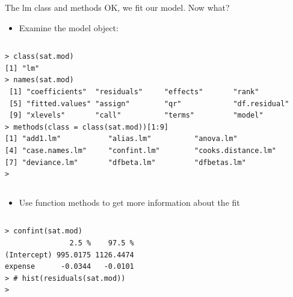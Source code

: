 \documentclass[table,smaller]{beamer}
\begin{document}
\begin{frame}[fragile,label=sec-2-5]{The lm class and methods}
 OK, we fit our model. Now what?
\begin{itemize}
\item Examine the model object:
\end{itemize}

\vspace{-.5em}
\begin{columns}
\begin{block}{}
\begin{verbatim}
> class(sat.mod)
[1] "lm"
> names(sat.mod)
 [1] "coefficients"  "residuals"     "effects"       "rank"         
 [5] "fitted.values" "assign"        "qr"            "df.residual"  
 [9] "xlevels"       "call"          "terms"         "model"        
> methods(class = class(sat.mod))[1:9]
[1] "add1.lm"           "alias.lm"          "anova.lm"         
[4] "case.names.lm"     "confint.lm"        "cooks.distance.lm"
[7] "deviance.lm"       "dfbeta.lm"         "dfbetas.lm"       
>
\end{verbatim}
\end{block}
\end{columns}
\vspace{.5em}

\begin{itemize}
\item Use function methods to get more information about the fit
\end{itemize}

\vspace{-.5em}
\begin{columns}
\begin{block}{}
\begin{verbatim}
> confint(sat.mod)
               2.5 %    97.5 %
(Intercept) 995.0175 1126.4474
expense      -0.0344   -0.0101
> # hist(residuals(sat.mod))
>
\end{verbatim}
\end{block}
\end{columns}
\vspace{.5em}
\end{frame}
\end{document}
